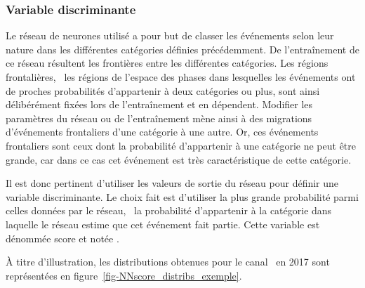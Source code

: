\subsubsection{Variable discriminante}
Le réseau de neurones utilisé a pour but de classer les événements selon leur nature dans les différentes catégories définies précédemment.
De l'entraînement de ce réseau résultent les frontières entre les différentes catégories.
Les régions frontalières, \ie\ les régions de l'espace des phases dans lesquelles les événements ont de proches probabilités d'appartenir à deux catégories ou plus, sont ainsi délibérément fixées lors de l'entraînement et en dépendent.
Modifier les paramètres du réseau ou de l'entraînement mène ainsi à des migrations d'événements frontaliers d'une catégorie à une autre.
Or, ces événements frontaliers sont ceux dont la probabilité d'appartenir à une catégorie ne peut être grande, car dans ce cas cet événement est très caractéristique de cette catégorie.
\par
Il est donc pertinent d'utiliser les valeurs de sortie du réseau pour définir une variable discriminante.
Le choix fait est d'utiliser la plus grande probabilité parmi celles données par le réseau, \ie\ la probabilité d'appartenir à la catégorie dans laquelle le réseau estime que cet événement fait partie.
Cette variable est dénommée \og score \fg{} et notée \NNscore.
\par
{}
\par
À titre d'illustration, les distributions obtenues pour le canal \ele\mu\ en 2017 sont représentées en figure~\ref{fig-NNscore_distribs_exemple}.
